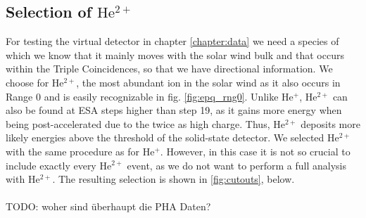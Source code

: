 \subsection{Selection of $\mathrm{He^{2+}}$}
For testing the virtual detector in chapter \ref{chapter:data} we need a species of which we know that it mainly moves with the solar wind bulk and that occurs within the Triple Coincidences, so that we have directional information. We choose for $\mathrm{He^{2+}}$, the most abundant ion in the solar wind \citep[][,ch. 6.1]{prlss_2004} as it also occurs in Range 0 and is easily recognizable in fig. \ref{fig:epq_rng0}.
Unlike $\mathrm{He^{+}}$, $\mathrm{He^{2+}}$ can also be found at ESA steps higher than step 19, as it gains more energy when being post-accelerated due to the twice as high charge. Thus, $\mathrm{He^{2+}}$ deposits more likely energies above the threshold of the solid-state detector. 
We selected $\mathrm{He^{2+}}$ with the same procedure as for $\mathrm{He^{+}}$. However, in this case it is not so crucial to include exactly every $\mathrm{He^{2+}}$ event, as we do not want to perform a full analysis with $\mathrm{He^{2+}}$. The resulting selection is shown in \ref{fig:cutouts}, below.
\\ \\
TODO: woher sind überhaupt die PHA Daten?\\
%
%
%
